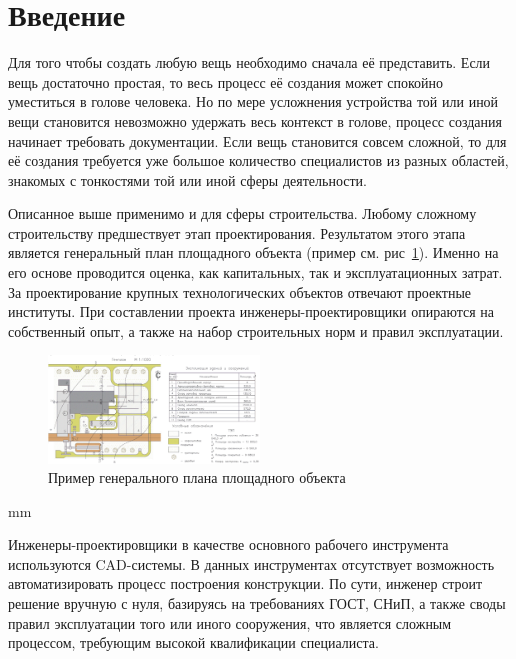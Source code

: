 \section*{\Large{Введение}}


Для того чтобы создать любую вещь необходимо сначала её представить.
Если вещь достаточно простая, то весь процесс её создания может спокойно уместиться в голове человека.
Но по мере усложнения устройства той или иной вещи становится невозможно удержать весь контекст в голове,
процесс создания начинает требовать документации.
Если вещь становится совсем сложной, то для её создания требуется уже большое количество специалистов из разных
областей, знакомых с тонкостями той или иной сферы деятельности.

Описанное выше применимо и для сферы строительства.
Любому сложному строительству предшествует этап проектирования.
Результатом этого этапа является генеральный план площадного объекта (пример см. рис\ \ref{pic:introduction__site-plan}).
Именно на его основе проводится оценка, как капитальных, так и эксплуатационных затрат.
За проектирование крупных технологических объектов отвечают проектные институты.
При составлении проекта инженеры-проектировщики опираются на собственный опыт, а также на набор строительных норм
и правил эксплуатации.

\begin{figure}[H]
	\hspace*{-2.5 cm}\includegraphics[width=0.5\textwidth]{introduction/pictures/site_plan}
	\caption{Пример генерального плана площадного объекта}
	\label{pic:introduction__site-plan}
\end{figure}
 mm

Инженеры-проектировщики в качестве основного рабочего инструмента используются CAD-системы.
В данных инструментах отсутствует возможность автоматизировать процесс построения конструкции.
По сути, инженер строит решение вручную с нуля, базируясь на требованиях ГОСТ, СНиП, а также своды правил
эксплуатации того или иного сооружения, что является сложным процессом, требующим высокой квалификации специалиста.
